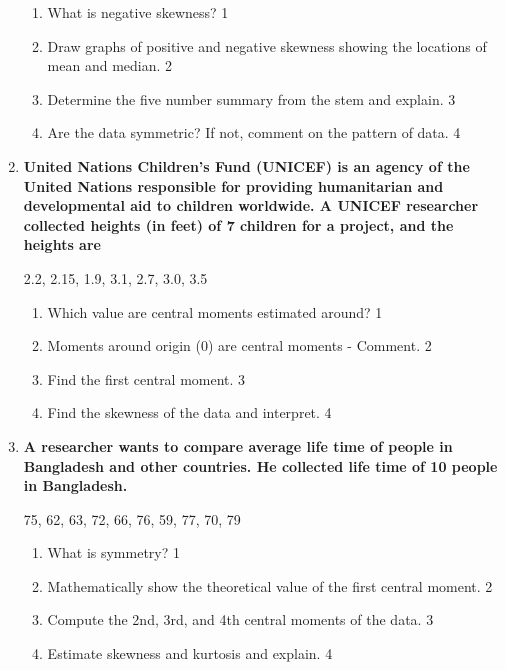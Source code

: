 \documentclass[a4paper,oneside]{book}
\begin{document}
\begin{enumerate}
  \begin{enumerate}
    \item
	What is negative skewness? \hfill 1
    \item
	Draw graphs of positive and negative skewness showing the locations of mean and median. \hfill 2
    \item  
	Determine the five number summary from the stem and explain. \hfill 3
    \item
	Are the data symmetric? If not, comment on the pattern of data. \hfill 4
\end{enumerate}

 \item
	  \textbf{United Nations Children's Fund (UNICEF) is an agency of the United Nations responsible for providing humanitarian and developmental aid to children worldwide. A  UNICEF researcher collected heights (in feet) of 7 children for a project, and the heights are} 

	\begin{center}
	  2.2, 2.15, 1.9, 3.1, 2.7, 3.0, 3.5
	  	\end{center}
  
  \begin{enumerate}
    \item
	Which value are central moments estimated around? \hfill 1
    \item
	Moments around origin (0) are central moments - Comment. \hfill 2
    \item  
	Find the first central moment. \hfill 3
    \item
	Find the skewness of the data and interpret.  \hfill 4
  \end{enumerate}
  
   \item
	  \textbf{A researcher wants to compare average life time of people in Bangladesh and other countries. He collected life time of 10 people in Bangladesh.} 
	  
	  	\begin{center}
	  75, 62, 63, 72, 66, 76, 59, 77, 70, 79
	  	\end{center}
  
  \begin{enumerate}
    \item
	What is symmetry? \hfill 1
    \item
	Mathematically show the theoretical value of the first central moment. \hfill 2
    \item  
	Compute the 2nd, 3rd, and 4th central moments of the data. \hfill 3
    \item
	Estimate skewness and kurtosis and explain. \hfill 4
  \end{enumerate}
  

\end{enumerate}
\end{document}
